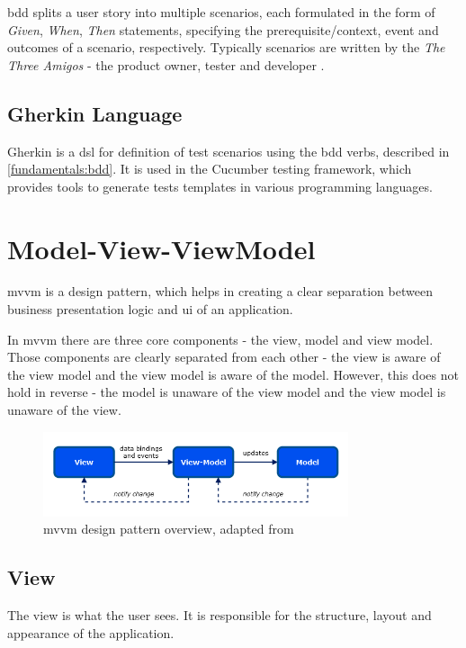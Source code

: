 \gls{bdd} splits a user story into multiple scenarios, each formulated in the form of \textit{Given}, \textit{When}, \textit{Then} statements, specifying the prerequisite/context, event and outcomes of a scenario, respectively. 
\label{amigos}
Typically scenarios are written by the \textit{The Three Amigos} - the product owner, tester and developer \parencite{cucumber_amigos}.

\subsection{Gherkin Language}

Gherkin \parencite{gherkin_language} is a \gls{dsl} for definition of test scenarios using the \gls{bdd} verbs, described in \ref{fundamentals:bdd}. It is used in the Cucumber testing framework, which provides tools to generate tests templates in various programming languages.

\section{Model-View-ViewModel}
\label{sec:mvvm}
\gls{mvvm} is a design pattern, which helps in creating a clear separation between business presentation logic and \gls{ui} of an application. \parencite[7-9]{microsoft_mvvm}

In \gls{mvvm} there are three core components - the view, model and view model. Those components are clearly separated from each other - the view is aware of the view model and the view model is aware of the model. However, this does not hold in reverse - the model is unaware of the view model and the view model is unaware of the view. 

\begin{figure}[H]
  \centering
  \includegraphics[width=0.8\textwidth]{images/mvvm.png}
   \caption{\gls{mvvm} design pattern overview, adapted from \parencite[7]{microsoft_mvvm}}
   \label{fig:mvvm}
 \end{figure}

\subsection{View}
The view is what the user sees. It is responsible for the structure, layout and appearance of the application.
